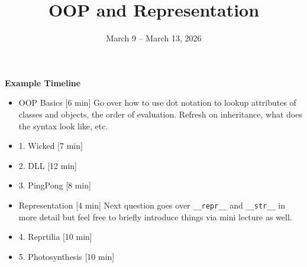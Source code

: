 \documentclass{exam}
\title{OOP and Representation}
\date{March 9 -- March 13, 2026}
\begin{document}
\maketitle


\begin{meta}
    \textbf{Example Timeline}
    \begin{itemize}
        \item OOP Basics [6 min]
        \subitem Go over how to use dot notation to lookup attributes of classes and objects, the order of evaluation. 
        \subitem Refresh on inheritance, what does the syntax look like, etc. 
        \item 1. Wicked  [7 min]
        \item 2. DLL [12 min]
        \item 3. PingPong [8 min]
        \item Representation [4 min]
        \subitem Next question goes over \lstinline{__repr__} and \lstinline{__str__}  in more detail but feel free to briefly introduce things via mini lecture as well. 
        \item 4. Reprtilia [10 min] 
        \item 5. Photosynthesis [10 min] 
    \end{itemize}
\end{meta} 
\end{document}
